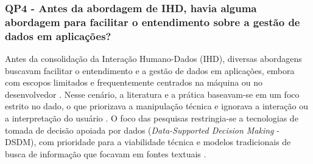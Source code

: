 \documentclass[
	12pt,				%
	oneside,			%
	a4paper,			%
	english,			%
	brazil				%
	]{abntex2ppgsi}
\begin{document}



    \subsubsection{QP4 - Antes da abordagem de IHD, havia alguma abordagem para facilitar o entendimento sobre a gestão de dados em aplicações?}

    Antes da consolidação da Interação Humano-Dados (IHD), diversas abordagens buscavam facilitar o entendimento e a gestão de dados em aplicações, embora com escopos limitados e frequentemente centrados na máquina ou no desenvolvedor \cite{calvetti2024human, coleti2024human, Zou2020769, Locoro2020, Strey2019Human}. Nesse cenário, a literatura e a prática baseavam-se em um foco estrito no dado, o que priorizava a manipulação técnica e ignorava a interação ou a interpretação do usuário \cite{Capeleti2024Human}. O foco das pesquisas restringia-se a tecnologias de tomada de decisão apoiada por dados (\textit{Data-Supported Decision Making} - DSDM), com prioridade para a viabilidade técnica e modelos tradicionais de busca de informação que focavam em fontes textuais \cite{sailaja2021exploring, koesten2021talking}. 
\end{document}
